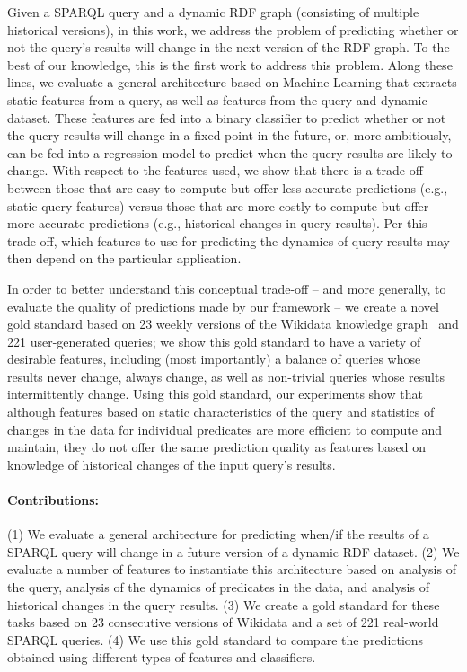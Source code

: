 \documentclass[runningheads]{llncs}
\begin{document}
Given a SPARQL query and a dynamic RDF graph (consisting of multiple historical versions), in this work, we address the problem of predicting whether or not the query's results will change in the next version of the RDF graph. To the best of our knowledge, this is the first work to address this problem. Along these lines, we evaluate a general architecture based on Machine Learning that extracts static features from a query, as well as features from the query and dynamic dataset. These features are fed into a binary classifier to predict whether or not the query results will change in a fixed point in the future, or, more ambitiously, can be fed into a regression model to predict when the query results are likely to change. With respect to the features used, we show that there is a trade-off between those that are easy to compute but offer less accurate predictions (e.g., static query features) versus those that are more costly to compute but offer more accurate predictions (e.g., historical changes in query results). Per this trade-off, which features to use for predicting the dynamics of query results may then depend on the particular application.

In order to better understand this conceptual trade-off -- and more generally, to evaluate the quality of predictions made by our framework -- we create a novel gold standard based on 23 weekly versions of the Wikidata knowledge graph~\cite{VrandecicK14} and 221 user-generated queries; we show this gold standard to have a variety of desirable features, including (most importantly) a balance of queries whose results never change, always change, as well as non-trivial queries whose results intermittently change. Using this gold standard, our experiments show that although features based on static characteristics of the query and statistics of changes in the data for individual predicates are more efficient to compute and maintain, they do not offer the same prediction quality as features based on knowledge of historical changes of the input query's results.

\paragraph{Contributions:} (1) We evaluate a general architecture for predicting when/if the results of a SPARQL query will change in a future version of a dynamic RDF dataset. (2) We evaluate a number of features to instantiate this architecture based on analysis of the query, analysis of the dynamics of predicates in the data, and analysis of historical changes in the query results. (3) We create a gold standard for these tasks based on 23 consecutive versions of Wikidata and a set of 221 real-world SPARQL queries. (4) We use this gold standard to compare the predictions obtained using different types of features and classifiers.
\end{document}
